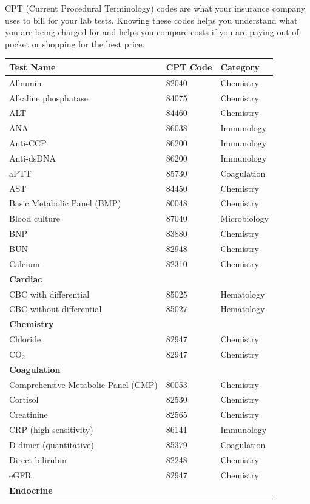 CPT (Current Procedural Terminology) codes are what your insurance company uses to bill for your lab tests. Knowing these codes helps you understand what you are being charged for and helps you compare costs if you are paying out of pocket or shopping for the best price.

\begin{longtable}{@{}lll@{}}
\toprule
\textbf{Test Name} & \textbf{CPT Code} & \textbf{Category} \\
\midrule
\endhead
Albumin & 82040 & Chemistry \\
Alkaline phosphatase & 84075 & Chemistry \\
ALT & 84460 & Chemistry \\
ANA & 86038 & Immunology \\
Anti-CCP & 86200 & Immunology \\
Anti-dsDNA & 86200 & Immunology \\
aPTT & 85730 & Coagulation \\
AST & 84450 & Chemistry \\
Basic Metabolic Panel (BMP) & 80048 & Chemistry \\
Blood culture & 87040 & Microbiology \\
BNP & 83880 & Chemistry \\
BUN & 82948 & Chemistry \\
Calcium & 82310 & Chemistry \\
\textbf{Cardiac} & & \\
CBC with differential & 85025 & Hematology \\
CBC without differential & 85027 & Hematology \\
\textbf{Chemistry} & & \\
Chloride & 82947 & Chemistry \\
CO$_2$ & 82947 & Chemistry \\
\textbf{Coagulation} & & \\
Comprehensive Metabolic Panel (CMP) & 80053 & Chemistry \\
Cortisol & 82530 & Chemistry \\
Creatinine & 82565 & Chemistry \\
CRP (high-sensitivity) & 86141 & Immunology \\
D-dimer (quantitative) & 85379 & Coagulation \\
Direct bilirubin & 82248 & Chemistry \\
eGFR & 82947 & Chemistry \\
\textbf{Endocrine} & & \\

\end{longtable}
